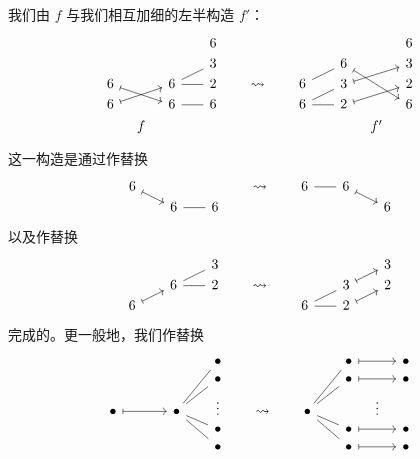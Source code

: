 我们由 $f$ 与我们相互加细的左半构造 $f'$：
\[
\begin{tikzcd}[row sep = 1,column sep = 8]
  & &   & &  6 & & & & & & & & 6 \\
  & &   & & 3 & & & &  & & 6 \ar[ddrr,mapsto] & & 3 \\
6 \ar[drr,mapsto] & & 6 \ar[rr,-] \ar[rru,-] & & 2 & & \rightsquigarrow & & 6 \ar[urr,-]& & 3 \ar[urr,mapsto] & & 2\\
6 \ar[urr,mapsto] & & 6 \ar[rr,-]  & & 6 & & & & 6 \ar[rr,-] \ar[urr,-] & & 2 \ar[urr,mapsto] & & 6\\
 & f & & & & & & & & & & f' &  \\
\end{tikzcd}
\]
这一构造是通过作替换
\[ \begin{tikzcd} [row sep = 1, column sep = 8]
6 \ar[drr,mapsto] & &              & &   & & \rightsquigarrow & & 6 \ar[rr,-]  & &   6 \ar[drr,mapsto]                 & &  \\
                  & & 6  \ar[rr,-] & & 6 & &                  & &               & &                    & & 6\\
\end{tikzcd} \]
以及作替换
\[ \begin{tikzcd} [row sep = 1, column sep = 8]
 & & & & 3 & & & & & &  & & 3\\
 & & 6 \ar[urr,-] \ar[rr,-] & & 2 & & \rightsquigarrow & &  & & 3 \ar[urr,mapsto] & & 2\\
6 \ar[urr,mapsto] & & & & & & & & 6 \ar[rr,-] \ar[urr,-] & & 2 \ar[urr,mapsto] & & \\
\end{tikzcd} \]
完成的。更一般地，我们作替换
\[ \begin{tikzcd} [row sep = 1, column sep = 8]
 & & & & & & \bullet & & & & & & \bullet \ar[rr,mapsto] & & \bullet \\
 & & & & & & \bullet & & & &  & & \bullet \ar[rr,mapsto] & & \bullet \\
 \bullet \ar[rrrr,mapsto] & & & & \bullet \ar[rruu,-] \ar[rru,-]\ar[rrd,-] \ar[rrdd,-] & & \vdots  & & \rightsquigarrow & & \bullet \ar[uurr,-] \ar[urr,-] \ar[drr,-] \ar[ddrr,-]  & &  & \vdots &   \\
 & & & & & & \bullet & &  & & & &  \bullet \ar[rr,mapsto] & & \bullet \\
  & & & & & & \bullet & & & &  & &  \bullet \ar[rr,mapsto] & & \bullet \\
\end{tikzcd} \]



